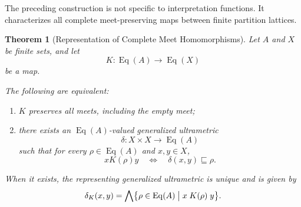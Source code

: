 \documentclass[11pt]{article}
\theoremstyle{plain}
\newtheorem{theorem}{Theorem}[section]
\theoremstyle{definition}
\theoremstyle{remark}
\begin{document}
The preceding construction is not specific
to interpretation functions.
It characterizes all complete meet-preserving maps
between finite partition lattices.

\begin{theorem}[Representation of Complete Meet Homomorphisms]
  \label{ik.thm.representation}
  Let \(A\) and \(X\) be finite sets,
  and let
  \[
    K:
    \operatorname{Eq}(A)
    \longrightarrow
    \operatorname{Eq}(X)
  \]
  be a map.

  The following are equivalent:
  \begin{enumerate}[label=(\alph*)]
    \item \(K\) preserves all meets,
          including the empty meet;
    \item there exists an
          \(\operatorname{Eq}(A)\)-valued
          generalized ultrametric
          \[
            \delta:
            X\times X
            \longrightarrow
            \operatorname{Eq}(A)
          \]
          such that for every
          \(\rho\in\operatorname{Eq}(A)\)
          and \(x,y\in X\),
          \[
            x\mathrel{K(\rho)}y
            \quad\Longleftrightarrow\quad
            \delta(x,y)
            \sqsubseteq
            \rho.
          \]
  \end{enumerate}

  When it exists,
  the representing generalized ultrametric is unique and is given by
  \[
    \delta_K(x,y)
    =
    \bigwedge
    \bigl\{
    \rho
    \in
    \operatorname{Eq}(A)
    \bigm|
    x\mathrel{K(\rho)}y
    \bigr\}.
  \]
\end{theorem}
\end{document}
